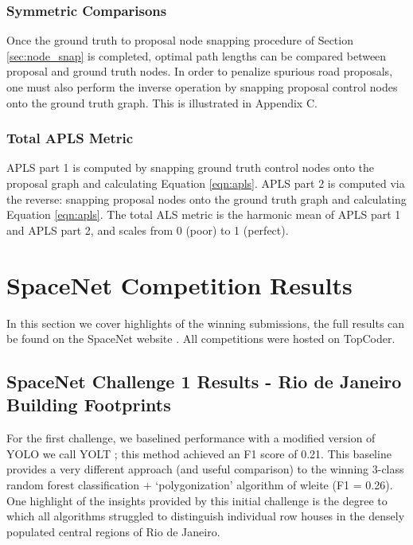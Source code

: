 \documentclass{article}
\begin{document}
\subsubsection{Symmetric Comparisons}

Once the ground truth to proposal node snapping procedure of Section \ref{sec:node_snap} is completed, optimal path lengths can be compared between proposal and ground truth nodes. In order to penalize spurious road proposals, one must also perform the inverse operation by snapping proposal control nodes onto the ground truth graph. This is illustrated in 
Appendix C.  




\subsubsection{Total APLS Metric}
APLS part 1 is computed by snapping ground truth control nodes onto the proposal graph and calculating Equation \ref{eqn:apls}.  APLS part 2 is computed via the reverse: snapping proposal nodes onto the ground truth graph and calculating Equation \ref{eqn:apls}. The total ALS metric is the harmonic mean of APLS part 1 and APLS part 2, and scales from 0 (poor) to 1 (perfect).




\section{SpaceNet Competition Results}

In this section we cover highlights of the winning submissions, the full results can be found on the SpaceNet website \cite{sn_web}.
All competitions were hosted on TopCoder.

\subsection{SpaceNet Challenge 1 Results - Rio de Janeiro Building Footprints}

For the first challenge, we baselined performance with a modified version of YOLO \cite{yolo9000} we call YOLT \cite{yolt}; this method achieved an F1 score of 0.21. This baseline provides a very different approach (and useful comparison) to the winning 3-class random forest classification + `polygonization' algorithm of wleite  \cite{wleite} (F1 = 0.26). One highlight of the insights provided by this initial challenge is the degree to which all algorithms struggled to distinguish individual row houses in the densely populated central regions of Rio de Janeiro.
\end{document}
